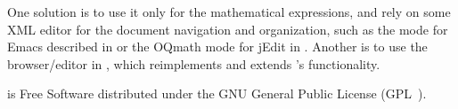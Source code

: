 One solution is to use it only for the mathematical expressions,
and rely on some XML editor for the document navigation and
organization, such as the {\omdoc} mode for Emacs described in
{} or the {\sc OQmath} mode for {\sc jEdit} in {}.
Another is to use the {} browser/editor in {},
which reimplements and extends {\qmath}'s functionality.

{\qmath} is Free Software distributed under the GNU General Public License (GPL~\cite{GPL}).


